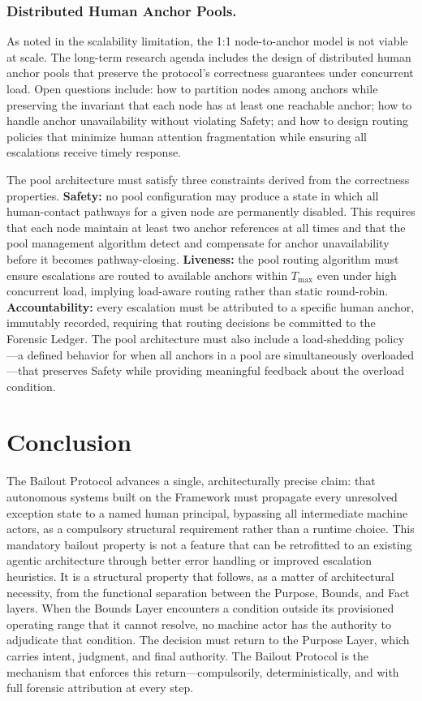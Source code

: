 \subsubsection{Distributed Human Anchor Pools.}

As noted in the scalability limitation, the 1:1 node-to-anchor model is not viable at scale. The long-term research agenda includes the design of distributed human anchor pools that preserve the protocol's correctness guarantees under concurrent load. Open questions include: how to partition nodes among anchors while preserving the invariant that each node has at least one reachable anchor; how to handle anchor unavailability without violating Safety; and how to design routing policies that minimize human attention fragmentation while ensuring all escalations receive timely response.

The pool architecture must satisfy three constraints derived from the correctness properties. \textbf{Safety:} no pool configuration may produce a state in which all human-contact pathways for a given node are permanently disabled. This requires that each node maintain at least two anchor references at all times and that the pool management algorithm detect and compensate for anchor unavailability before it becomes pathway-closing. \textbf{Liveness:} the pool routing algorithm must ensure escalations are routed to available anchors within $T_{\max}$ even under high concurrent load, implying load-aware routing rather than static round-robin. \textbf{Accountability:} every escalation must be attributed to a specific human anchor, immutably recorded, requiring that routing decisions be committed to the Forensic Ledger. The pool architecture must also include a load-shedding policy---a defined behavior for when all anchors in a pool are simultaneously overloaded---that preserves Safety while providing meaningful feedback about the overload condition.

\section{Conclusion}\label{sec:conclusion}

The Bailout Protocol advances a single, architecturally precise claim: that autonomous systems built on the \bxthree{} Framework must propagate every unresolved exception state to a named human principal, bypassing all intermediate machine actors, as a compulsory structural requirement rather than a runtime choice. This mandatory bailout property is not a feature that can be retrofitted to an existing agentic architecture through better error handling or improved escalation heuristics. It is a structural property that follows, as a matter of architectural necessity, from the functional separation between the Purpose, Bounds, and Fact layers. When the Bounds Layer encounters a condition outside its provisioned operating range that it cannot resolve, no machine actor has the authority to adjudicate that condition. The decision must return to the Purpose Layer, which carries intent, judgment, and final authority. The Bailout Protocol is the mechanism that enforces this return---compulsorily, deterministically, and with full forensic attribution at every step.

